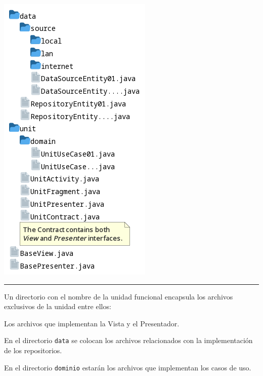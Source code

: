 \begin{multicols}{2}
\begin{Figure}%
	\centering
	\includegraphics[width=0.8\linewidth]{Figures/design/DIR_generic_unit.png}
	\rule{\linewidth}{1pt}
	\label{fig:dir_unit}
\end{Figure}

\columnbreak %
Un directorio con el nombre de la unidad funcional encapsula los archivos exclusivos de la unidad entre ellos:

Los archivos que implementan la Vista y el Presentador.

En el directorio \texttt{data} se colocan los archivos relacionados con la implementación de los repositorios.

En el directorio \texttt{dominio} estarán los archivos que implementan los casos de uso.
	
\end{multicols}


